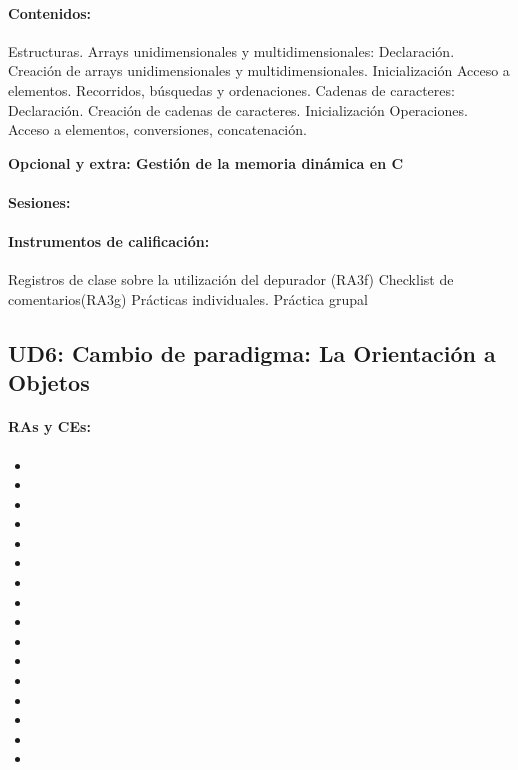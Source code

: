  		\paragraph{Contenidos:}
		Estructuras.
		Arrays unidimensionales y multidimensionales:  Declaración.  Creación de arrays unidimensionales y multidimensionales.  Inicialización  Acceso a elementos.  Recorridos, búsquedas y ordenaciones.
		Cadenas de caracteres: Declaración.  Creación de cadenas de caracteres.  Inicialización Operaciones. Acceso a elementos, conversiones, concatenación.

		\textbf{Opcional y extra: Gestión de la memoria dinámica en C}


	\paragraph{Sesiones:}
	\paragraph{Instrumentos de calificación:}
		Registros de clase sobre la utilización del depurador (RA3f)
		Checklist de comentarios(RA3g)
		Prácticas individuales.
		Práctica grupal



\newpage
\subsection{UD6: Cambio de paradigma: La Orientación a Objetos}

	\paragraph{RAs y CEs:}
	\begin{itemize}[itemsep=0.1em, topsep=0.1em]
		\item\RAUNOf
		\item\RAUNOi		
		\item\RATRESe
		\item\RATRESf
		\item\RATRESg
		\item\RADOSa
		\item\RADOSb
		\item\RADOSc
		\item\RADOSd
		\item\RADOSe
		\item\RADOSf
		\item\RADOSh
		\item\RADOSi		
		\item\RACINCOa
		\item\RACINCOb
		\item\RACINCOc
	\end{itemize}

